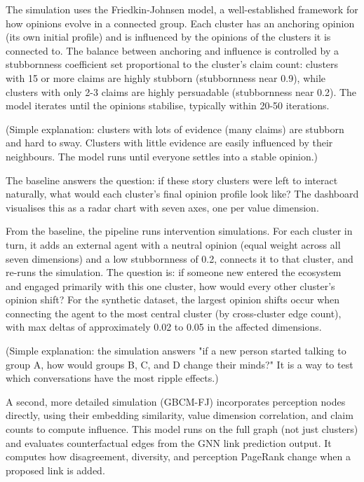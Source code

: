 \documentclass[11pt,a4paper]{article}
\begin{document}
The simulation uses the Friedkin-Johnsen model, a well-established
framework for how opinions evolve in a connected group. Each cluster has
an anchoring opinion (its own initial profile) and is influenced by the
opinions of the clusters it is connected to. The balance between
anchoring and influence is controlled by a stubbornness coefficient set
proportional to the cluster's claim count: clusters with 15 or more
claims are highly stubborn (stubbornness near 0.9), while clusters with
only 2-3 claims are highly persuadable (stubbornness near 0.2). The
model iterates until the opinions stabilise, typically within 20-50
iterations.

(Simple explanation: clusters with lots of evidence (many claims) are
stubborn and hard to sway. Clusters with little evidence are easily
influenced by their neighbours. The model runs until everyone settles
into a stable opinion.)

The baseline answers the question: if these story clusters were left to
interact naturally, what would each cluster's final opinion profile look
like? The dashboard visualises this as a radar chart with seven axes,
one per value dimension.

From the baseline, the pipeline runs intervention simulations. For each
cluster in turn, it adds an external agent with a neutral opinion (equal
weight across all seven dimensions) and a low stubbornness of 0.2,
connects it to that cluster, and re-runs the simulation. The question
is: if someone new entered the ecosystem and engaged primarily with this
one cluster, how would every other cluster's opinion shift? For the
synthetic dataset, the largest opinion shifts occur when connecting the
agent to the most central cluster (by cross-cluster edge count), with
max deltas of approximately 0.02 to 0.05 in the affected dimensions.

(Simple explanation: the simulation answers "if a new person started
talking to group A, how would groups B, C, and D change their minds?"
It is a way to test which conversations have the most ripple effects.)

A second, more detailed simulation (GBCM-FJ) incorporates perception
nodes directly, using their embedding similarity, value dimension
correlation, and claim counts to compute influence. This model runs on
the full graph (not just clusters) and evaluates counterfactual edges
from the GNN link prediction output. It computes how disagreement,
diversity, and perception PageRank change when a proposed link is added.
\end{document}
